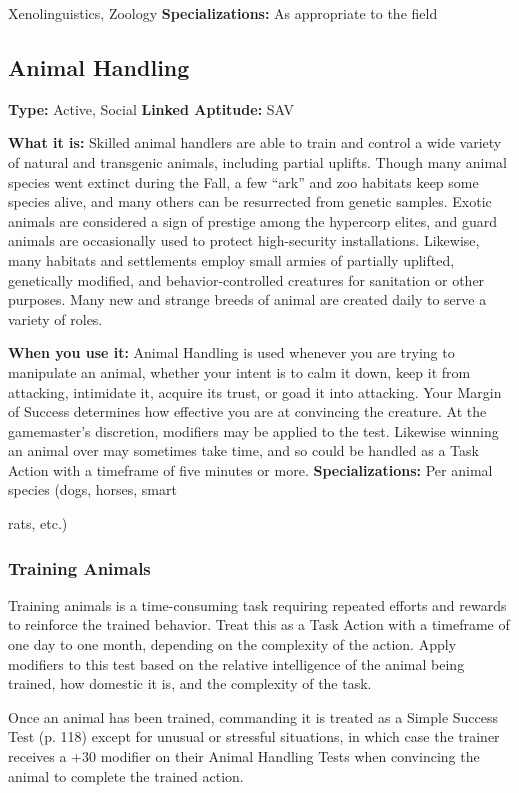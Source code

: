Xenolinguistics, Zoology
\textbf{Specializations:} As appropriate to the field

\subsection{Animal Handling}

\textbf{Type:} Active, Social
\textbf{Linked Aptitude:} SAV

\textbf{What it is:} Skilled animal handlers are able to 
train and control a wide variety of natural and transgenic
animals, including partial uplifts. Though many
animal species went extinct during the Fall, a few 
``ark'' and zoo habitats keep some species alive, and 
many others can be resurrected from genetic samples. 
Exotic animals are considered a sign of prestige 
among the hypercorp elites, and guard animals are 
occasionally used to protect high-security installations. 
Likewise, many habitats and settlements employ small 
armies of partially uplifted, genetically modified, and 
behavior-controlled creatures for sanitation or other 
purposes. Many new and strange breeds of animal are 
created daily to serve a variety of roles.

\textbf{When you use it:} Animal Handling is used whenever 
you are trying to manipulate an animal, whether your 
intent is to calm it down, keep it from attacking, intimidate
it, acquire its trust, or goad it into attacking.
Your Margin of Success determines how effective you 
are at convincing the creature. At the gamemaster's 
discretion, modifiers may be applied to the test. Likewise
winning an animal over may sometimes take
time, and so could be handled as a Task Action with a 
timeframe of five minutes or more.
\textbf{Specializations:} Per animal species (dogs, horses, smart 

rats, etc.)

\subsubsection{Training Animals}

Training animals is a time-consuming task requiring 
repeated efforts and rewards to reinforce the trained 
behavior. Treat this as a Task Action with a timeframe 
of one day to one month, depending on the complexity
of the action. Apply modifiers to this test based on
the relative intelligence of the animal being trained, 
how domestic it is, and the complexity of the task.

Once an animal has been trained, commanding 
it is treated as a Simple Success Test (p. 118) except 
for unusual or stressful situations, in which case the 
trainer receives a +30 modifier on their Animal Handling
Tests when convincing the animal to complete
the trained action.

